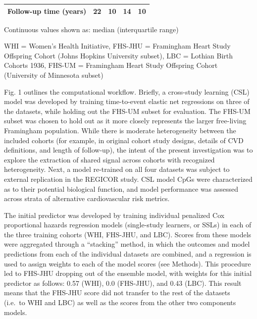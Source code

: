 \documentclass[]{article}
\begin{document}
\begin{table}
\begin{threeparttable}
\begin{tabular}[t]{lllll}
Follow-up time (years) & 22 & 10 & 14 & 10\\
\bottomrule
\end{tabular}
\begin{tablenotes}
\item * Continuous values shown as: median (interquartile range)
\item WHI = Women's Health Initiative, FHS-JHU = Framingham Heart Study Offspring Cohort (Johns Hopkins University subset), LBC = Lothian Birth Cohorts 1936, FHS-UM = Framingham Heart Study Offspring Cohort (University of Minnesota subset)
\end{tablenotes}
\end{threeparttable}
\end{table}

Fig. 1 outlines the computational workflow. Briefly, a cross-study
learning (CSL) model was developed by training time-to-event elastic net
regressions on three of the datasets, while holding out the FHS-UM
subset for evaluation. The FHS-UM subset was chosen to hold out as it
more closely represents the larger free-living Framingham population.
While there is moderate heterogeneity between the included cohorts (for
example, in original cohort study designs, details of CVD definitions,
and length of follow-up), the intent of the present investigation was to
explore the extraction of shared signal across cohorts with recognized
heterogeneity. Next, a model re-trained on all four datasets was subject
to external replication in the REGICOR study. CSL model CpGs were
characterized as to their potential biological function, and model
performance was assessed across strata of alternative cardiovascular
risk metrics.

The initial predictor was developed by training individual penalized Cox
proportional hazards regression models (single-study learners, or SSLs)
in each of the three training cohorts (WHI, FHS-JHU, and LBC). Scores
from these models were aggregated through a ``stacking'' method, in
which the outcomes and model predictions from each of the individual
datasets are combined, and a regression is used to assign weights to
each of the model scores (see Methods). This procedure led to FHS-JHU
dropping out of the ensemble model, with weights for this initial
predictor as follows: 0.57 (WHI), 0.0 (FHS-JHU), and 0.43 (LBC). This
result means that the FHS-JHU score did not transfer to the rest of the
datasets (i.e.~to WHI and LBC) as well as the scores from the other two
components models.
\end{document}
